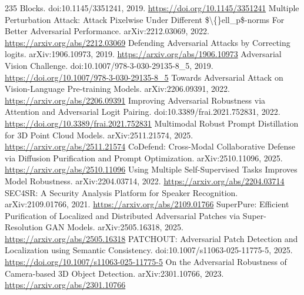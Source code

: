\documentclass[11pt]{article}
\begin{document}
\begin{thebibliography}{235}
 Blocks. doi:10.1145/3351241, 2019. \url{https://doi.org/10.1145/3351241}
 Multiple Perturbation Attack: Attack Pixelwise Under Different \$\textbackslash\{\}ell\_p\$-norms For Better Adversarial Performance. arXiv:2212.03069, 2022. \url{https://arxiv.org/abs/2212.03069}
 Defending Adversarial Attacks by Correcting logits. arXiv:1906.10973, 2019. \url{https://arxiv.org/abs/1906.10973}
 Adversarial Vision Challenge. doi:10.1007/978-3-030-29135-8\_5, 2019. \url{https://doi.org/10.1007/978-3-030-29135-8_5}
 Towards Adversarial Attack on Vision-Language Pre-training Models. arXiv:2206.09391, 2022. \url{https://arxiv.org/abs/2206.09391}
 Improving Adversarial Robustness via Attention and Adversarial Logit Pairing. doi:10.3389/frai.2021.752831, 2022. \url{https://doi.org/10.3389/frai.2021.752831}
 Multimodal Robust Prompt Distillation for 3D Point Cloud Models. arXiv:2511.21574, 2025. \url{https://arxiv.org/abs/2511.21574}
 CoDefend: Cross-Modal Collaborative Defense via Diffusion Purification and Prompt Optimization. arXiv:2510.11096, 2025. \url{https://arxiv.org/abs/2510.11096}
 Using Multiple Self-Supervised Tasks Improves Model Robustness. arXiv:2204.03714, 2022. \url{https://arxiv.org/abs/2204.03714}
 SEC4SR: A Security Analysis Platform for Speaker Recognition. arXiv:2109.01766, 2021. \url{https://arxiv.org/abs/2109.01766}
 SuperPure: Efficient Purification of Localized and Distributed Adversarial Patches via Super-Resolution GAN Models. arXiv:2505.16318, 2025. \url{https://arxiv.org/abs/2505.16318}
 PATCHOUT: Adversarial Patch Detection and Localization using Semantic Consistency. doi:10.1007/s11063-025-11775-5, 2025. \url{https://doi.org/10.1007/s11063-025-11775-5}
 On the Adversarial Robustness of Camera-based 3D Object Detection. arXiv:2301.10766, 2023. \url{https://arxiv.org/abs/2301.10766}
\end{thebibliography}
\end{document}
